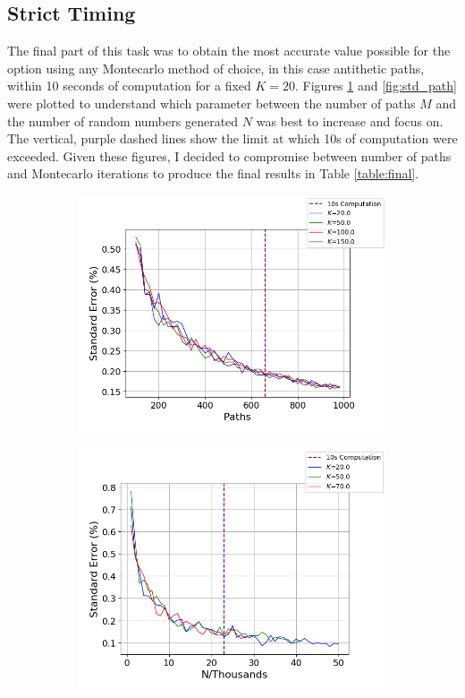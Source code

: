 \documentclass{article}
\begin{document}
\subsection*{Strict Timing}
The final part of this task was to obtain the most accurate value possible for the option using any Montecarlo method of choice, in this case antithetic paths, within 10 seconds of computation for a fixed $K=20$.
Figures \ref{fig:std_n} and \ref{fig:std_path} were plotted to understand which parameter between the number of paths $M$ and the number of random numbers generated $N$ was best to increase and focus on.
The vertical, purple dashed lines show the limit at which 10s of computation were exceeded.
Given these figures, I decided to compromise between number of paths and Montecarlo iterations to produce the final results in Table \ref{table:final}.
\begin{figure}[!h]
  \centering
  \begin{subfigure}{0.6\textwidth}
      \includegraphics[width=\linewidth]{task_2_2_plot_2.png}
      \label{fig:std_n}
  \end{subfigure}
  \medskip
  \begin{subfigure}{0.6\textwidth}
      \includegraphics[width=\linewidth]{task_2_2_plot_6.png}

\end{subfigure}
\end{figure}
\end{document}
